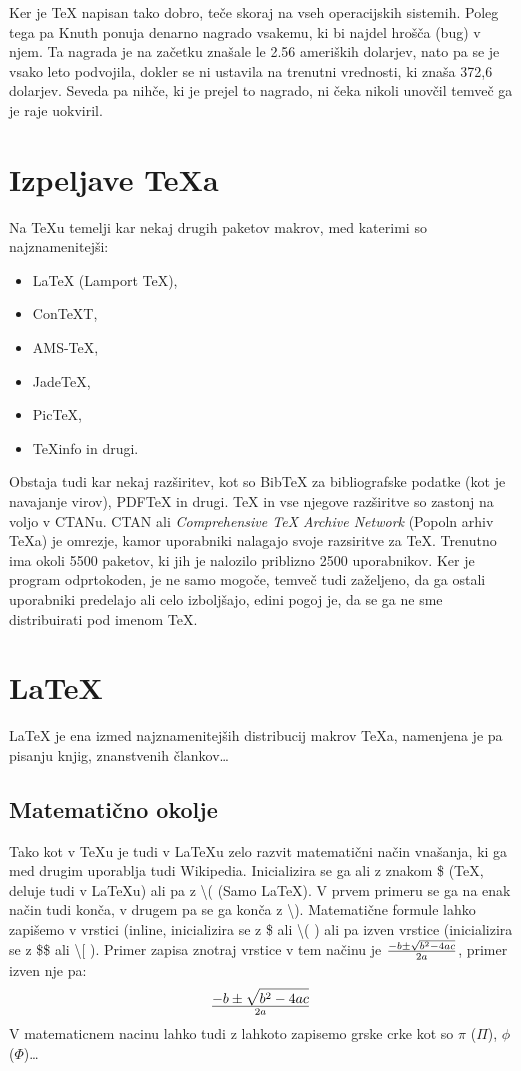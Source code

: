 \documentclass[10p, a4paper, twopage]{book}
\begin{document}
Ker je \TeX{} napisan tako dobro, teče skoraj na vseh operacijskih sistemih. Poleg tega pa Knuth ponuja denarno nagrado vsakemu, ki bi najdel hrošča (bug) v njem. Ta nagrada je na začetku znašale le 2.56 ameriških dolarjev, nato pa se je vsako leto podvojila, dokler se ni ustavila na trenutni vrednosti, ki znaša 372,6 dolarjev. Seveda pa nihče, ki je prejel to nagrado, ni čeka nikoli unovčil temveč ga je raje uokviril. 

\chapter{Izpeljave \TeX{}a}
Na \TeX{}u temelji kar nekaj drugih paketov makrov, med katerimi so najznamenitejši:
\begin{itemize}
\item \LaTeX{} (Lamport \TeX{}),
\item Con\TeX{}T,
\item AMS-\TeX{},
\item Jade\TeX{},
\item Pic\TeX{},
\item \TeX{}info in drugi.
\end{itemize}

Obstaja tudi kar nekaj razširitev, kot so Bib\TeX{} za bibliografske podatke (kot je navajanje virov), PDF\TeX{} in drugi. 
\TeX{} in vse njegove razširitve so zastonj na voljo v CTANu. CTAN ali \textit{Comprehensive \TeX{} Archive Network} (Popoln arhiv \TeX{}a) je omrezje, kamor uporabniki nalagajo svoje razsiritve za \TeX{}. Trenutno ima okoli 5500 paketov, ki jih je nalozilo priblizno 2500 uporabnikov.
Ker je program odprtokoden, je ne samo mogoče, temveč tudi zaželjeno, da ga ostali uporabniki predelajo ali celo izboljšajo, edini pogoj je, da se ga ne sme distribuirati pod imenom \TeX{}.

\chapter{\LaTeX{}}
\LaTeX{} je ena izmed najznamenitejših distribucij makrov \TeX{}a, namenjena je pa pisanju knjig, znanstvenih člankov\ldots 

\section{Matematično okolje}
Tako kot v \TeX{}u je tudi v \LaTeX{}u zelo razvit matematični način vnašanja, ki ga med drugim uporablja tudi Wikipedia. Inicializira se ga ali z znakom \${} (\TeX{}, deluje tudi v \LaTeX{}u) ali pa z \textbackslash{}( (Samo \LaTeX{}). V prvem primeru se ga na enak način tudi konča, v drugem pa se ga konča z \textbackslash{}). Matematične formule lahko zapišemo v vrstici (inline, inicializira se z \${} ali \textbackslash{}( ) ali pa izven vrstice (inicializira se z \${}\${} ali \textbackslash{}[ ). Primer zapisa znotraj vrstice v tem načinu je \(- b \pm \sqrt{b^2 - 4ac} \over 2a\), primer izven nje pa: \[- b \pm \sqrt{b^2 - 4ac} \over 2a\] V matematicnem nacinu lahko tudi z lahkoto zapisemo grske crke kot so $\pi{}$ ($\Pi{}$), $\phi{}$ ($\Phi{}$)\ldots
\end{document}
